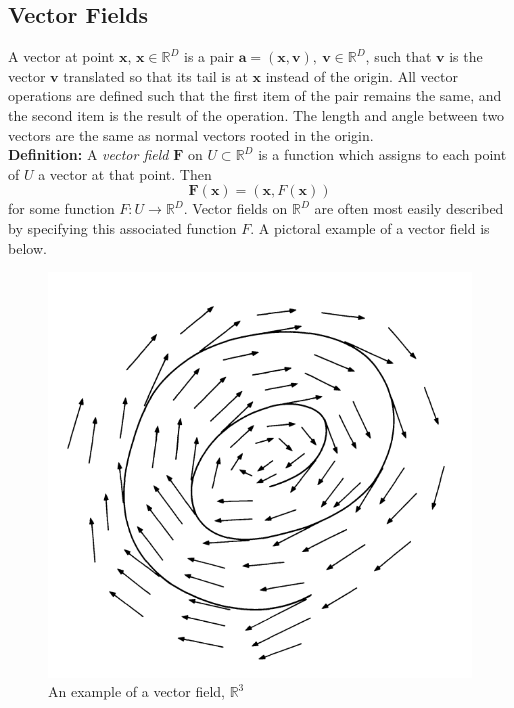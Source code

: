 \documentclass[12pt]{report}
\begin{document}
\subsection{Vector Fields}
A vector at point $\mathbf{x}$, $\mathbf{x} \in \mathbb{R}^{D}$ is a pair 
$\mathbf{a} = (\mathbf{x}, \mathbf{v}), \ \mathbf{v} \in \mathbb{R}^{D}$, 
such that $\mathbf{v}$ is the vector $\mathbf{v}$ translated 
so that its tail is at $\mathbf{x}$ instead of the origin. 
All vector operations are defined such that the first item of 
the pair remains the same, 
and the second item is the result of the operation. 
The length and angle between two vectors are the same 
as normal vectors rooted in the origin.\\
\textbf{Definition:} A \textit{vector field} $\mathbf{F}$ on 
$U \subset \mathbb{R}^{D}$ is a function which assigns to each point
of $U$ a vector at that point. Then
$$\mathbf{F}(\mathbf{x}) = (\mathbf{x}, F(\mathbf{x}))$$ for some function 
$F: U \longrightarrow \mathbb{R}^{D}$. Vector fields on 
$\mathbb{R}^{D}$ are often most easily described by 
specifying this associated function $F$.
A pictoral example of a vector field is below.
\begin{figure}[ht]
    \begin{center}
        \includegraphics[scale=0.5]{fig2.5.PNG}
        \caption{An example of a vector field, $\mathbb{R}^3$}
        \label{fig:vectorfield}
    \end{center}
\end{figure}
\end{document}
